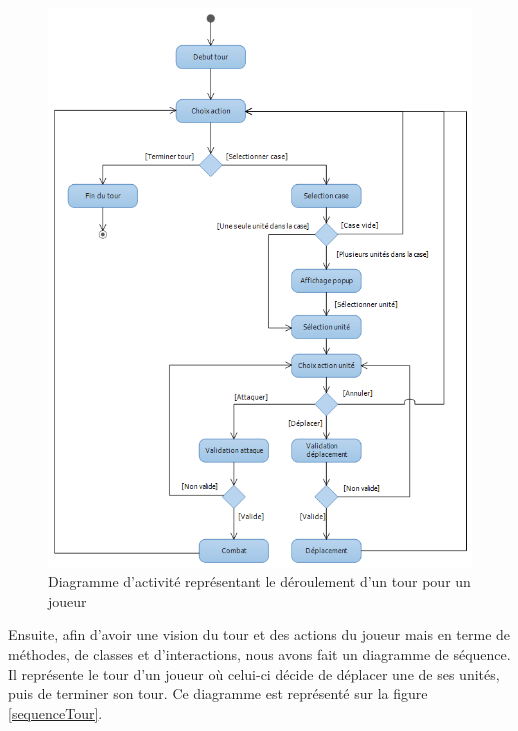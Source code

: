 \begin{figure}[!h] 
\centerline{\includegraphics[scale=0.58]{img/activite_tour_ex.png}}
   \caption{\label{étiquette} Diagramme d'activité représentant le déroulement d'un tour pour un joueur}
\label{activiteTour}
\end{figure}

Ensuite, afin d'avoir une vision du tour et des actions du joueur mais en terme de méthodes, de classes et d'interactions, nous avons fait un diagramme de séquence. Il représente le tour d'un joueur où celui-ci décide de déplacer une de ses unités, puis de terminer son tour. Ce diagramme est représenté sur la figure \ref{sequenceTour}.\\

